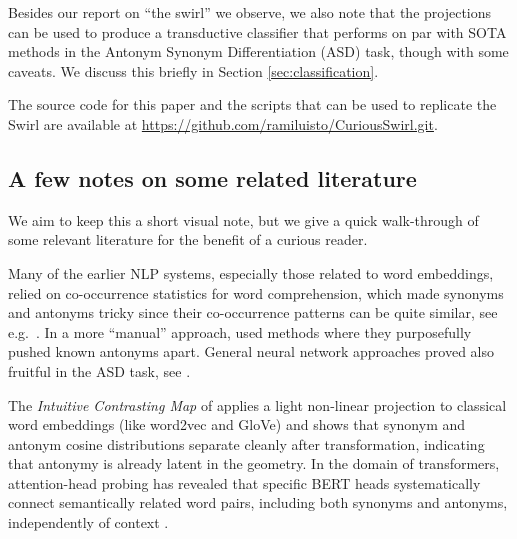 \documentclass[a4paper]{article}
\theoremstyle{definition}
\theoremstyle{remark}
\numberwithin{equation}{section}
\begin{document}
Besides our report on ``the swirl'' we observe, we also note that the projections can be used to produce a transductive classifier that performs on par with SOTA methods in the Antonym Synonym Differentiation (ASD) task, though with some caveats. We discuss this briefly in Section \ref{sec:classification}.


The source code for this paper and the scripts that can be used to replicate the Swirl are available at \url{https://github.com/ramiluisto/CuriousSwirl.git}.




\subsection{A few notes on some related literature}
\label{subsec:litreview}

We aim to keep this a short visual note, but we give a quick walk-through of some relevant literature for the benefit of a curious reader.

Many of the earlier NLP systems, especially those related to word embeddings, relied on co-occurrence statistics for word comprehension, which made synonyms and antonyms tricky since their co-occurrence patterns can be quite similar, see e.g.\ \cite{brunila2022company}.
In a more ``manual'' approach, \cite{Ono2015, Nguyen2016Contrast,  Mrksic2016Counterfit, Mrksic2017AttractRepel, Dou2018AntSent} used methods where they purposefully pushed known antonyms apart.
General neural network approaches proved also fruitful in the ASD task, see \cite{Nguyen2017AntSynNET,Etcheverry2019Siamese,Ali2019Distiller}.

The \emph{Intuitive Contrasting Map} of \cite{samenko2021intuitive} applies a light non-linear
projection to classical word embeddings (like word2vec and GloVe) and shows that synonym and antonym cosine distributions
separate cleanly after transformation, indicating that antonymy is
already latent in the geometry. In the domain of transformers, attention-head probing has revealed that specific BERT heads systematically connect semantically related word pairs, including both synonyms and antonyms, independently of context \cite{Serina2023Heads}.


\end{document}
